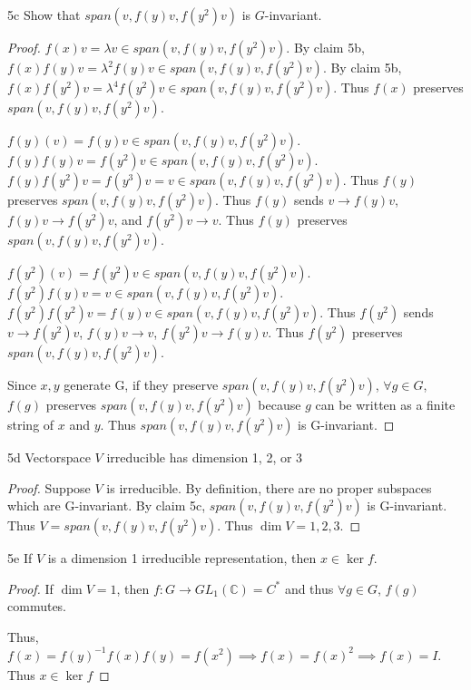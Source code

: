 \documentclass{article}
\newcommand{\C}{\mathbb{C}}
\begin{document}

\begin{claim}{5c}\label{Claim 5c.}
    Show that $span(v, f(y)v, f(y^2)v)$ is $G$-invariant.
\end{claim}
\begin{proof}
    $f(x)v = \lambda v \in span(v, f(y)v, f(y^2)v)$. By claim 5b, $f(x)f(y)v = \lambda^2 f(y) v \in span(v, f(y)v, f(y^2)v)$. By claim 5b, $f(x)f(y^2)v = \lambda^4 f(y^2) v \in span(v, f(y)v, f(y^2)v)$. Thus $f(x)$ preserves $span(v, f(y)v, f(y^2)v)$.
    
    $f(y)(v) = f(y)v \in span(v, f(y)v, f(y^2)v)$. $f(y)f(y)v = f(y^2)v \in span(v, f(y)v, f(y^2)v)$. $f(y)f(y^2)v = f(y^3)v = v \in span(v, f(y)v, f(y^2)v)$. Thus $f(y)$ preserves $span(v, f(y)v, f(y^2)v)$. Thus $f(y)$ sends $v \to f(y)v$, $f(y)v \to f(y^2)v$, and $f(y^2)v \to v$. Thus $f(y)$ preserves $span(v, f(y)v, f(y^2)v). $
    
    
    $f(y^2)(v) = f(y^2)v \in span(v, f(y)v, f(y^2)v)$. $f(y^2)f(y)v = v \in span(v, f(y)v, f(y^2)v)$. $f(y^2)f(y^2)v = f(y)v \in span(v, f(y)v, f(y^2)v)$. Thus $f(y^2)$ sends $v \to f(y^2)v$, $f(y)v \to v$, $f(y^2)v \to f(y)v$. Thus $f(y^2)$ preserves $span(v, f(y)v, f(y^2)v)$.

    Since $x, y$ generate G, if they preserve $span(v, f(y)v, f(y^2)v)$, $\forall g \in G$, $f(g)$ preserves $span(v, f(y)v, f(y^2)v)$ because $g$ can be written as a finite string of $x$ and $y$. 
    Thus $span(v, f(y)v, f(y^2)v)$ is G-invariant.      
\end{proof}

\begin{claim}{5d}\label{Claim 5d.}
    Vectorspace $V$ irreducible has dimension 1, 2, or 3 
\end{claim}
\begin{proof}
    Suppose $V$ is irreducible. By definition, there are no proper subspaces which are G-invariant. By claim 5c, $span(v, f(y)v, f(y^2)v)$ is G-invariant. Thus $V = span(v, f(y)v, f(y^2)v)$. Thus $\dim V = 1, 2, 3$.      
\end{proof}

\begin{claim}{5e}\label{Claim 5e.}
    If $V$ is a dimension 1 irreducible representation, then $x \in \ker f$.  
\end{claim}
\begin{proof}
    If $\dim V = 1$, then $f: G \to GL_1(\C) = C^*$ and thus $\forall g \in G$, $f(g)$ commutes. 
    
    Thus, $f(x) = f(y)^{-1}f(x)f(y) = f(x^2) \implies f(x) = f(x)^{2} \implies f(x) = I$. Thus $x \in \ker f$  
\end{proof}
\end{document}
